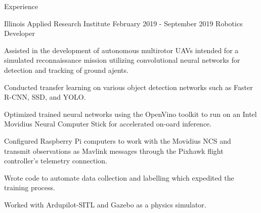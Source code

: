 \documentclass{resume} %
\begin{document}

\begin{rSection}{Experience}

    \begin{rSubsection}{Illinois Applied Research Institute} {February 2019 - September 2019} {Robotics Developer}

        \item Assisted in the development of autonomous multirotor UAVs intended for a simulated reconnaissance mission utilizing convolutional neural networks for detection and tracking of ground ajents.
        \item Conducted transfer learning on various object detection networks such as Faster R-CNN, SSD, and YOLO.
        \item Optimized trained neural networks using the OpenVino toolkit to run on an Intel Movidius Neural Computer Stick for accelerated on-oard inference.
        \item Configured Raspberry Pi computers to work with the Movidius NCS and transmit observations as Mavlink messages through the Pixhawk flight controller's telemetry connection.
        \item Wrote code to automate data collection and labelling which expedited the training process.
        \item Worked with Ardupilot-SITL and Gazebo as a physics simulator.

    \end{rSubsection}

\end{rSection}

\end{document}

